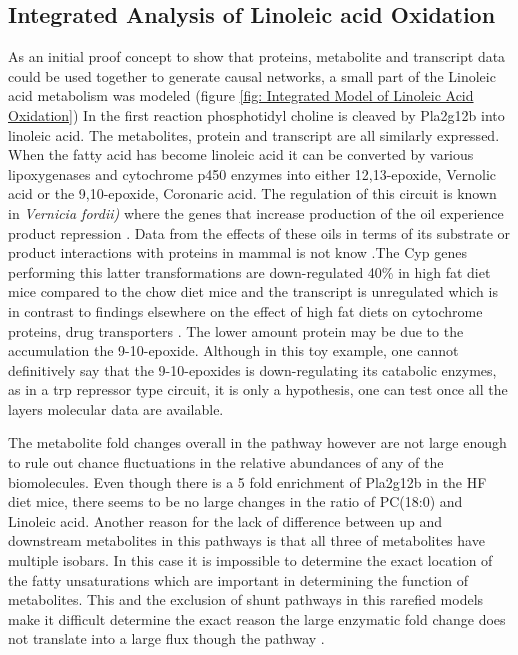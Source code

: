 \documentclass[a4paper,11pt,twoside]{book}
\begin{document}
	\subsection{Integrated Analysis of Linoleic acid Oxidation}
	As an initial proof concept to show that proteins, metabolite and transcript data could be used together to generate causal networks, a small part of the Linoleic acid metabolism was modeled (figure \ref{fig: Integrated Model of Linoleic Acid Oxidation})	In the first reaction phosphotidyl choline is cleaved by Pla2g12b into linoleic acid. The metabolites, protein and transcript are all similarly expressed. When the fatty acid has become linoleic acid it can be converted by various lipoxygenases and cytochrome p450 enzymes into either 12,13-epoxide, Vernolic acid or the  9,10-epoxide, Coronaric acid. The regulation of this circuit is known in \textit{Vernicia fordii)} where the genes that increase production of the oil experience product repression \citep{Li2010Vernonia}. Data from the effects of these oils in terms of its substrate or product interactions with proteins in mammal is not know .The Cyp genes performing this latter transformations are down-regulated 40\% in high fat diet mice compared to the chow diet mice and the transcript is unregulated which is in contrast to findings elsewhere on the effect of high fat diets on cytochrome proteins, drug transporters \citep{Ghose2011HFD}. The lower amount protein may be due to the accumulation the 9-10-epoxide. Although in this toy example, one cannot definitively say that the 9-10-epoxides is down-regulating its catabolic enzymes, as in a trp repressor type circuit, it is only a hypothesis, one can test once all the layers molecular data are available. 
	
	The metabolite fold changes overall in the pathway however are not large enough to rule out chance fluctuations in the relative abundances of any of the biomolecules. Even though there is a 5 fold enrichment of Pla2g12b in the HF diet mice, there seems to be no large changes in the ratio of PC(18:0) and Linoleic acid. Another reason for the lack of difference between up and downstream metabolites in this pathways is that all three of metabolites have multiple isobars. In this case it is impossible to determine the exact location of the fatty unsaturations which are important in determining the function of metabolites. This and the exclusion of shunt pathways in this rarefied models make it difficult determine the exact reason the large enzymatic fold change does not translate into a large flux though the pathway \citep{Saa2016}.
	
\end{document}

